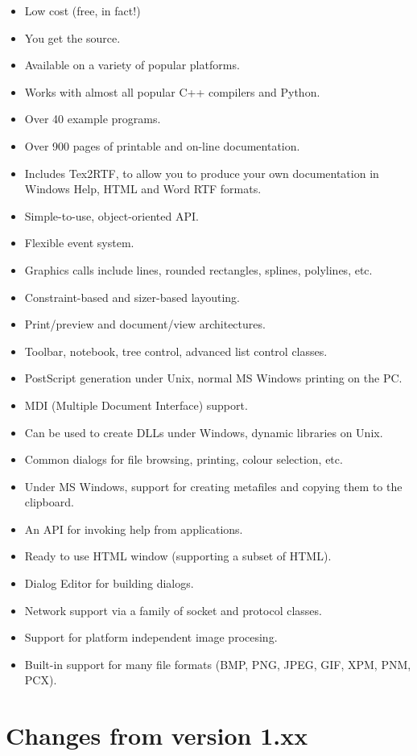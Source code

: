 \begin{itemize}\itemsep=0pt
\item Low cost (free, in fact!)
\item You get the source.
\item Available on a variety of popular platforms.
\item Works with almost all popular C++ compilers and Python.
\item Over 40 example programs.
\item Over 900 pages of printable and on-line documentation.
\item Includes Tex2RTF, to allow you to produce your own documentation
in Windows Help, HTML and Word RTF formats.
\item Simple-to-use, object-oriented API.
\item Flexible event system.
\item Graphics calls include lines, rounded rectangles, splines, polylines, etc.
\item Constraint-based and sizer-based layouting.
\item Print/preview and document/view architectures.
\item Toolbar, notebook, tree control, advanced list control classes.
\item PostScript generation under Unix, normal MS Windows printing on the PC.
\item MDI (Multiple Document Interface) support.
\item Can be used to create DLLs under Windows, dynamic libraries on Unix.
\item Common dialogs for file browsing, printing, colour selection, etc.
\item Under MS Windows, support for creating metafiles and copying
them to the clipboard.
\item An API for invoking help from applications.
\item Ready to use HTML window (supporting a subset of HTML).
\item Dialog Editor for building dialogs.
\item Network support via a family of socket and protocol classes.
\item Support for platform independent image procesing.
\item Built-in support for many file formats (BMP, PNG, JPEG, GIF, XPM, PNM, PCX).
\end{itemize}

\section{Changes from version 1.xx}\label{versionchanges}

